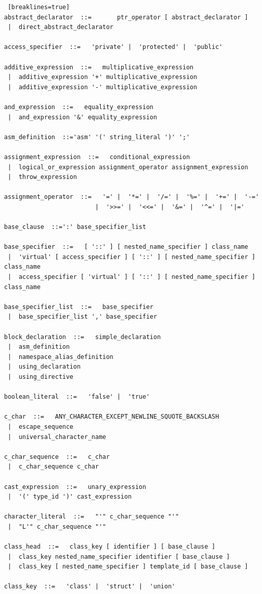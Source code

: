 \documentclass[11pt]{book}
\begin{document}
\begin{lstlisting} [breaklines=true]
abstract_declarator  ::=	   ptr_operator [ abstract_declarator ]
 |  direct_abstract_declarator

access_specifier  ::=   'private' |  'protected' |  'public'

additive_expression  ::=   multiplicative_expression
 |  additive_expression '+' multiplicative_expression
 |  additive_expression '-' multiplicative_expression

and_expression  ::=   equality_expression
 |  and_expression '&' equality_expression

asm_definition  ::='asm' '(' string_literal ')' ';'

assignment_expression  ::=   conditional_expression
 |  logical_or_expression assignment_operator assignment_expression
 |  throw_expression

assignment_operator  ::=   '=' |  '*=' |  '/=' |  '%=' |  '+=' |  '-=' 
                         |  '>>=' |  '<<=' |  '&=' |  '^=' |  '|='

base_clause  ::=':' base_specifier_list

base_specifier  ::=   [ '::' ] [ nested_name_specifier ] class_name
 |  'virtual' [ access_specifier ] [ '::' ] [ nested_name_specifier ] class_name
 |  access_specifier [ 'virtual' ] [ '::' ] [ nested_name_specifier ] class_name

base_specifier_list  ::=   base_specifier
 |  base_specifier_list ',' base_specifier

block_declaration  ::=   simple_declaration
 |  asm_definition
 |  namespace_alias_definition
 |  using_declaration
 |  using_directive

boolean_literal  ::=   'false' |  'true'

c_char  ::=   ANY_CHARACTER_EXCEPT_NEWLINE_SQUOTE_BACKSLASH
 |  escape_sequence
 |  universal_character_name

c_char_sequence  ::=   c_char
 |  c_char_sequence c_char

cast_expression  ::=   unary_expression
 |  '(' type_id ')' cast_expression

character_literal  ::=   "'" c_char_sequence "'"
 |  "L'" c_char_sequence "'"

class_head  ::=   class_key [ identifier ] [ base_clause ]
 |  class_key nested_name_specifier identifier [ base_clause ]
 |  class_key [ nested_name_specifier ] template_id [ base_clause ]

class_key  ::=   'class' |  'struct' |  'union'


\end{lstlisting}
\end{document}

